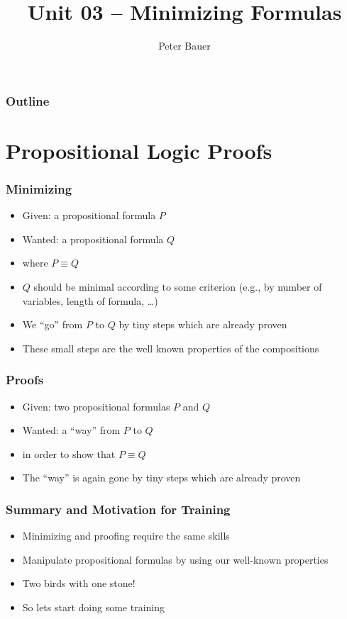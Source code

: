 \documentclass{beamer}
\title{Unit 03 – Minimizing Formulas}
\author{Peter Bauer}
\date{} %
\theoremstyle{remark}
\begin{document}
\frame{\titlepage}

\begin{frame}
	\frametitle{Outline}
	\tableofcontents
\end{frame}

\section{Propositional Logic Proofs}
\begin{frame}
	\frametitle{Minimizing}
	\begin{itemize}
		\item Given: a propositional formula $P$
		\item Wanted: a propositional formula $Q$
		\item where $P \equiv Q$
		\item $Q$ should be minimal according to some criterion (e.g., by number of variables, length of formula, \ldots)
		\item We ``go'' from $P$ to $Q$ by tiny steps which are already proven
		\item These small steps are the well known properties of the compositions
	\end{itemize}
\end{frame}

\begin{frame}
	\frametitle{Proofs}
	\begin{itemize}
		\item Given: two propositional formulas $P$ and $Q$
		\item Wanted: a ``way'' from $P$ to $Q$
		\item in order to show that $P \equiv Q$
		\item The ``way'' is again gone by tiny steps which are already proven
	\end{itemize}
\end{frame}

\begin{frame}
	\frametitle{Summary and Motivation for Training}
	\begin{itemize}
		\item Minimizing and proofing require the same skills
		\item Manipulate propositional formulas by using our well-known properties
		\item Two birds with one stone!
		\item So lets start doing some training
	\end{itemize}
\end{frame}
\end{document}

